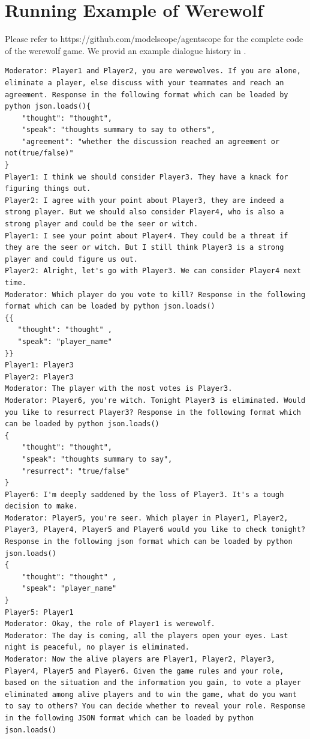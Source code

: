 \section{Running Example of Werewolf}
\label{app:wolf}

Please refer to https://github.com/modelscope/agentscope for the complete code of the werewolf game. We provid an example dialogue history in . 

\begin{lstlisting}[language=Werewolf, caption={Running example of werewolf.}, label={lst:wolf_history}]
Moderator: Player1 and Player2, you are werewolves. If you are alone, eliminate a player, else discuss with your teammates and reach an agreement. Response in the following format which can be loaded by python json.loads(){
    "thought": "thought",
    "speak": "thoughts summary to say to others",
    "agreement": "whether the discussion reached an agreement or not(true/false)"
}
Player1: I think we should consider Player3. They have a knack for figuring things out.
Player2: I agree with your point about Player3, they are indeed a strong player. But we should also consider Player4, who is also a strong player and could be the seer or witch.
Player1: I see your point about Player4. They could be a threat if they are the seer or witch. But I still think Player3 is a strong player and could figure us out.
Player2: Alright, let's go with Player3. We can consider Player4 next time.
Moderator: Which player do you vote to kill? Response in the following format which can be loaded by python json.loads()
{{
   "thought": "thought" ,
   "speak": "player_name"
}}
Player1: Player3
Player2: Player3
Moderator: The player with the most votes is Player3.
Moderator: Player6, you're witch. Tonight Player3 is eliminated. Would you like to resurrect Player3? Response in the following format which can be loaded by python json.loads()
{
    "thought": "thought",
    "speak": "thoughts summary to say",
    "resurrect": "true/false"
}
Player6: I'm deeply saddened by the loss of Player3. It's a tough decision to make.
Moderator: Player5, you're seer. Which player in Player1, Player2, Player3, Player4, Player5 and Player6 would you like to check tonight? Response in the following json format which can be loaded by python json.loads()
{
    "thought": "thought" ,
    "speak": "player_name"
}
Player5: Player1
Moderator: Okay, the role of Player1 is werewolf.
Moderator: The day is coming, all the players open your eyes. Last night is peaceful, no player is eliminated.
Moderator: Now the alive players are Player1, Player2, Player3, Player4, Player5 and Player6. Given the game rules and your role, based on the situation and the information you gain, to vote a player eliminated among alive players and to win the game, what do you want to say to others? You can decide whether to reveal your role. Response in the following JSON format which can be loaded by python json.loads()

\end{lstlisting}
